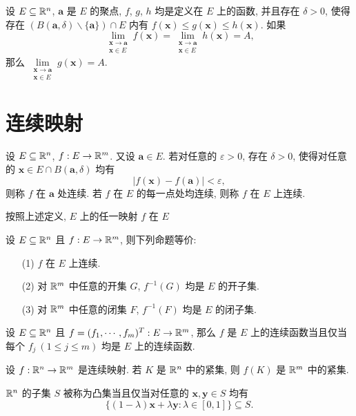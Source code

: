 \begin{theorem}[夹逼定理]
	设 $E \subseteq \mathbb {R}^{n}$, $\bm a$ 是 $E$ 的聚点, $f$, $g$, $h$ 均是定义在 $E$ 上的函数, 并且存在 $\delta>0$, 使得存在 $(B(\bm a,\delta)\backslash\{\bm a\})\cap E$ 内有 $f(\bm x)\le g(\bm x) \le h(\bm x)$. 如果
	$$\lim\limits_{\substack{\bm x\to\bm a \\ \bm x \in E}}f(\bm x)=\lim\limits_{\substack{\bm x\to\bm a \\ \bm x \in E}}h(\bm x)=A,$$
	那么 $\lim\limits_{\substack{\bm x\to \bm a \\ \bm x \in E}}g(\bm x)=A$.
\end{theorem}

\section{连续映射}
\begin{definition}[连续]
	设 $E \subseteq \mathbb {R}^{n}$, $f:E\to \mathbb {R}^{m}$. 又设 $\bm a \in E$. 若对任意的 $\varepsilon>0$, 存在 $\delta>0$, 使得对任意的 $\bm x \in E \cap B(\bm a, \delta)$ 均有
	$$|f(\bm x)-f(\bm a)|<\varepsilon,$$
	则称 $f$ 在 $\bm a$ 处连续. 若 $f$ 在 $E$ 的每一点处均连续, 则称 $f$ 在 $E$ 上连续.
\end{definition}

\begin{remark}
	按照上述定义, $E$ 上的任一映射 $f$ 在 $E$
\end{remark}

\begin{theorem}
	设 $E\subseteq \mathbb {R}^{n}$ 且 $f:E\to \mathbb {R}^{m}$, 则下列命题等价:
	\begin{itemize}[leftmargin=1.5cm,itemindent=0cm]
		\item[(1)] $f$ 在 $E$ 上连续.
		\item[(2)] 对 $\mathbb {R}^{m}$ 中任意的开集 $G$, $f^{-1}(G)$ 均是 $E$ 的开子集.
		\item[(3)] 对 $\mathbb {R}^{m}$ 中任意的闭集 $F$, $f^{-1}(F)$ 均是 $E$ 的闭子集.
	\end{itemize}
\end{theorem}

\begin{proposition}
	设 $E\subseteq \mathbb {R}^{n}$ 且 $f=(f_1,\cdots,f_m)^T:E\to \mathbb {R}^{m}$, 那么 $f$ 是 $E$ 上的连续函数当且仅当每个 $f_j\ (1 \le j \le m)$ 均是 $E$ 上的连续函数.
\end{proposition}

\begin{theorem}
	设 $f:\mathbb {R}^{n} \to \mathbb {R}^{m}$ 是连续映射. 若 $K$ 是 $\mathbb {R}^{n}$ 中的紧集, 则 $f(K)$ 是 $\mathbb {R}^{m}$ 中的紧集.
\end{theorem}

\begin{definition}[凸集]
	$\mathbb {R}^{n}$ 的子集 $S$ 被称为凸集当且仅当对任意的 $\bm x,\bm y \in S$ 均有 $$\{(1-\lambda)\bm x+\lambda\bm y:\lambda\in [0,1]\} \subseteq S.$$
\end{definition}